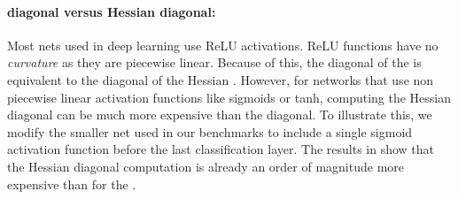 \paragraph{\GGN diagonal versus Hessian diagonal:}
Most nets used in deep learning use ReLU activations. ReLU functions have no
\emph{curvature} as they are piecewise linear. Because of this, the diagonal of
the \GGN is equivalent to the diagonal of the Hessian \citep{martens2014new}.
However, for networks that use non piecewise linear activation functions like
sigmoids or tanh, computing the Hessian diagonal can be much more expensive than
the \GGN diagonal. To illustrate this, we modify the smaller net used in our
benchmarks to include a single sigmoid activation function before the last
classification layer. The results in  show that
the Hessian diagonal computation is already an order of magnitude more expensive
than for the \GGN.


